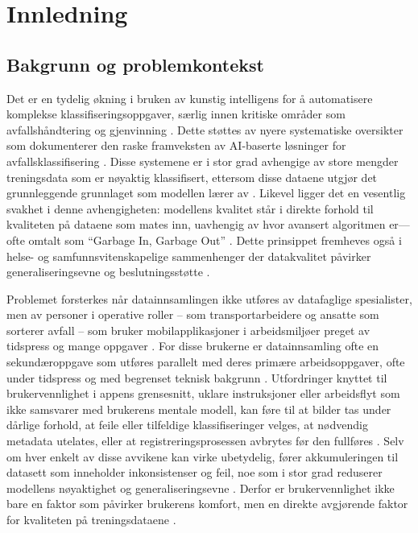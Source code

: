 \chapter{Innledning}
\label{chap:intro}

\section{Bakgrunn og problemkontekst}
Det er en tydelig økning i bruken av kunstig intelligens for å automatisere komplekse klassifiseringsoppgaver, særlig innen kritiske områder som avfallshåndtering og gjenvinning \cite{fotovvatikhah2025, yevle2025}. Dette støttes av nyere systematiske oversikter som dokumenterer den raske framveksten av AI-baserte løsninger for avfallsklassifisering \cite{fotovvatikhah2025}. Disse systemene er i stor grad avhengige av store mengder treningsdata som er nøyaktig klassifisert, ettersom disse dataene utgjør det grunnleggende grunnlaget som modellen lærer av \cite{geiger2021}. Likevel ligger det en vesentlig svakhet i denne avhengigheten: modellens kvalitet står i direkte forhold til kvaliteten på dataene som mates inn, uavhengig av hvor avansert algoritmen er—ofte omtalt som “Garbage In, Garbage Out” \cite{geiger2021, heck2025}. Dette prinsippet fremheves også i helse- og samfunnsvitenskapelige sammenhenger der datakvalitet påvirker generaliseringsevne og beslutningsstøtte \cite{teno2023}.

Problemet forsterkes når datainnsamlingen ikke utføres av datafaglige spesialister, men av personer i operative roller – som transportarbeidere og ansatte som sorterer avfall – som bruker mobilapplikasjoner i arbeidsmiljøer preget av tidspress og mange oppgaver \cite{muller2024, wenz2023}. For disse brukerne er datainnsamling ofte en sekundæroppgave som utføres parallelt med deres primære arbeidsoppgaver, ofte under tidspress og med begrenset teknisk bakgrunn \cite{muller2024}. Utfordringer knyttet til brukervennlighet i appens grensesnitt, uklare instruksjoner eller arbeidsflyt som ikke samsvarer med brukerens mentale modell, kan føre til at bilder tas under dårlige forhold, at feile eller tilfeldige klassifiseringer velges, at nødvendig metadata utelates, eller at registreringsprosessen avbrytes før den fullføres \cite{weichbroth2024, muller2024}. Selv om hver enkelt av disse avvikene kan virke ubetydelig, fører akkumuleringen til datasett som inneholder inkonsistenser og feil, noe som i stor grad reduserer modellens nøyaktighet og generaliseringsevne \cite{geiger2021, teno2023}. Derfor er brukervennlighet ikke bare en faktor som påvirker brukerens komfort, men en direkte avgjørende faktor for kvaliteten på treningsdataene \cite{muller2024, weichbroth2024}.

